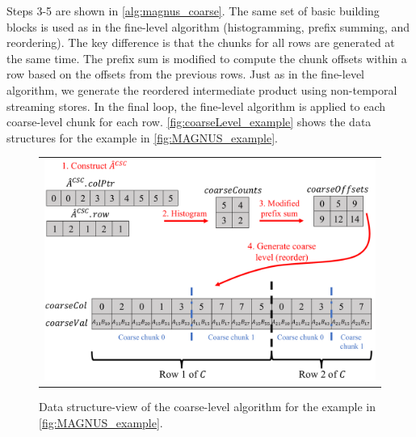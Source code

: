 Steps 3-5 are shown in \autoref{alg:magnus_coarse}.
The same set of basic building blocks is used as in the fine-level algorithm (histogramming, prefix summing, and reordering).
The key difference is that the chunks for all rows are generated at the same time.
The prefix sum is modified to compute the chunk offsets within a row based on the offsets from the previous rows.
Just as in the fine-level algorithm, we generate the reordered intermediate product using non-temporal streaming stores.
In the final loop, the fine-level algorithm is applied to each coarse-level chunk for each row.
\autoref{fig:coarseLevel_example} shows the data structures for the example in \autoref{fig:MAGNUS_example}.

\begin{figure}[htbp]
\centering
\begin{tabular}{c}
\includegraphics[width=0.9\linewidth]{figs/coarseLevel.pdf} 
\end{tabular}
\caption{Data structure-view of the coarse-level algorithm for the example in \autoref{fig:MAGNUS_example}.}
\label{fig:coarseLevel_example}
\end{figure}


